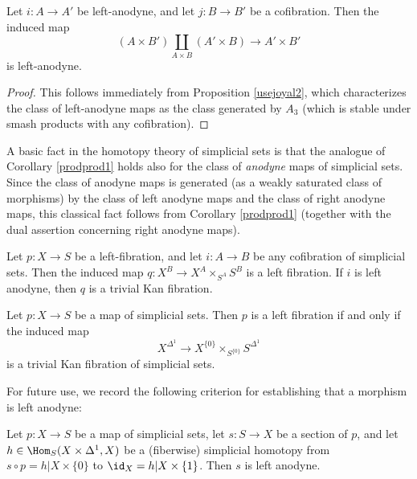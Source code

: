 \begin{corollary}\label{prodprod1}
Let $i: A \rightarrow A'$ be left-anodyne, and let $j: B \rightarrow B'$ be a cofibration. Then
the induced map $$(A \times B') \coprod_{A \times B} (A' \times B)
\rightarrow A' \times B'$$ is left-anodyne.
\end{corollary}

\begin{proof}
This follows immediately from Proposition \ref{usejoyal2}, which characterizes the class of left-anodyne maps as the class generated by $A_3$ (which is stable under smash products with any cofibration).
\end{proof}

\begin{remark}
A basic fact in the homotopy theory of simplicial sets is that the analogue of Corollary \ref{prodprod1} holds also for the class of {\em anodyne} maps of simplicial sets. Since the class of anodyne maps is generated (as a weakly saturated class of morphisms) by the class of left anodyne maps and the class of right anodyne maps, this classical fact follows from Corollary \ref{prodprod1} (together with the dual assertion concerning right anodyne maps).
\end{remark}

\begin{corollary}\label{ichy}
Let $p: X \rightarrow S$ be a left-fibration, and let $i: A \rightarrow B$ be any cofibration of simplicial sets. Then the induced map $q: X^{B} \rightarrow X^A \times_{ S^A } S^B$ is a left fibration. If $i$ is left anodyne, then $q$ is a trivial Kan fibration.
\end{corollary}

\begin{corollary}\label{helper}
Let $p: X \rightarrow S$ be a map of simplicial sets. Then $p$ is a left fibration if and only if the induced map
$$ X^{\Delta^1} \rightarrow X^{ \{0\} } \times_{ S^{ \{0\} } } S^{\Delta^1}$$
is a trivial Kan fibration of simplicial sets.
\end{corollary}

For future use, we record the following criterion for establishing that a morphism is left anodyne:

\begin{proposition}\label{trull11}
Let $p: X \rightarrow S$ be a map of simplicial sets, let
$s: S \rightarrow X$ be a section of $p$, and let
$h \in \Hom_{S}(X \times \Delta^1, X)$ be a (fiberwise)
simplicial homotopy from $s \circ p = h| X \times \{0\}$ to $\id_{X} = h| X \times \{1\}$. Then $s$
is left anodyne.
\end{proposition}

